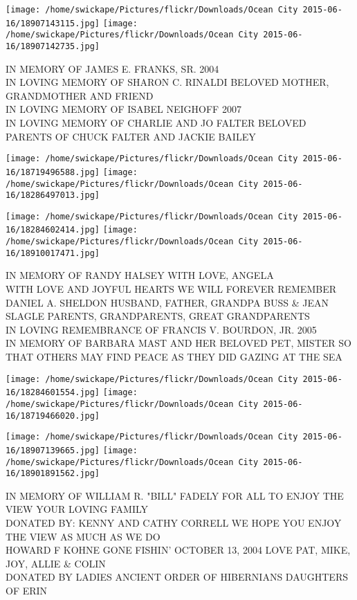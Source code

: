 \documentclass[10pt,letterpaper]{article}
\begin{document}
\texttt{[image: /home/swickape/Pictures/flickr/Downloads/Ocean City 2015-06-16/18907143115.jpg]}
\texttt{[image: /home/swickape/Pictures/flickr/Downloads/Ocean City 2015-06-16/18907142735.jpg]}

IN MEMORY OF JAMES E. FRANKS, SR. 2004\\
IN LOVING MEMORY OF SHARON C. RINALDI BELOVED MOTHER, GRANDMOTHER AND FRIEND\\
IN LOVING MEMORY OF ISABEL NEIGHOFF 2007\\
IN LOVING MEMORY OF CHARLIE AND JO FALTER BELOVED PARENTS OF CHUCK FALTER AND JACKIE BAILEY
\pagebreak

\texttt{[image: /home/swickape/Pictures/flickr/Downloads/Ocean City 2015-06-16/18719496588.jpg]}
\texttt{[image: /home/swickape/Pictures/flickr/Downloads/Ocean City 2015-06-16/18286497013.jpg]}

\texttt{[image: /home/swickape/Pictures/flickr/Downloads/Ocean City 2015-06-16/18284602414.jpg]}
\texttt{[image: /home/swickape/Pictures/flickr/Downloads/Ocean City 2015-06-16/18910017471.jpg]}

IN MEMORY OF RANDY HALSEY WITH LOVE, ANGELA\\
WITH LOVE AND JOYFUL HEARTS WE WILL FOREVER REMEMBER DANIEL A. SHELDON HUSBAND, FATHER, GRANDPA BUSS \& JEAN SLAGLE PARENTS, GRANDPARENTS, GREAT GRANDPARENTS\\
IN LOVING REMEMBRANCE OF FRANCIS V. BOURDON, JR. 2005\\
IN MEMORY OF BARBARA MAST AND HER BELOVED PET, MISTER SO THAT OTHERS MAY FIND PEACE AS THEY DID GAZING AT THE SEA
\pagebreak

\texttt{[image: /home/swickape/Pictures/flickr/Downloads/Ocean City 2015-06-16/18284601554.jpg]}
\texttt{[image: /home/swickape/Pictures/flickr/Downloads/Ocean City 2015-06-16/18719466020.jpg]}

\texttt{[image: /home/swickape/Pictures/flickr/Downloads/Ocean City 2015-06-16/18907139665.jpg]}
\texttt{[image: /home/swickape/Pictures/flickr/Downloads/Ocean City 2015-06-16/18901891562.jpg]}

IN MEMORY OF WILLIAM R. "BILL" FADELY FOR ALL TO ENJOY THE VIEW YOUR LOVING FAMILY\\
DONATED BY: KENNY AND CATHY CORRELL WE HOPE YOU ENJOY THE VIEW AS MUCH AS WE DO\\
HOWARD F KOHNE GONE FISHIN' OCTOBER 13, 2004 LOVE PAT, MIKE, JOY, ALLIE \& COLIN\\
DONATED BY LADIES ANCIENT ORDER OF HIBERNIANS DAUGHTERS OF ERIN
\pagebreak
\end{document}
